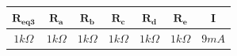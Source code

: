 \documentclass[12pt, a4paper]{article}
\begin{document}
\begin{table}[h]
    \centering
    \begin{tabular}{|c|c|c|c|c|c|c|}
        \hline
        $\mathbf{R_{eq3}}$ & $\mathbf{R_a}$ & $\mathbf{R_b}$ & $\mathbf{R_c}$ & $\mathbf{R_d}$ & $\mathbf{R_e}$ & $\mathbf{I}$\\
        \hline
        $1k\varOmega$ & $1k\varOmega$ & $1k\varOmega$ & $1k\varOmega$ & $1k\varOmega$ & $1k\varOmega$ & $9mA$ \\
        \hline

        
    \end{tabular}
\end{table}
\end{document}
